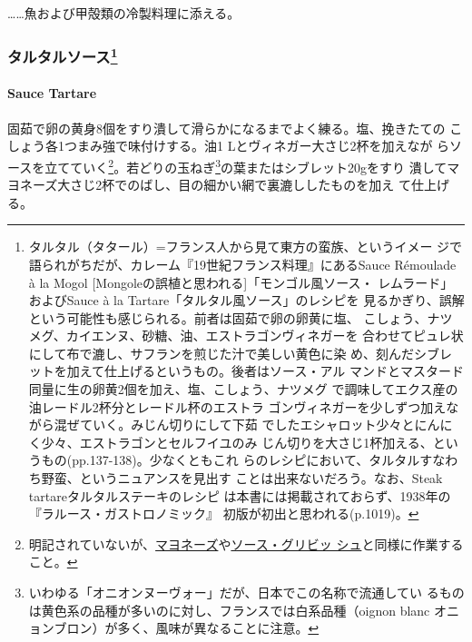 \begin{recette}
\ldots{}\ldots{}魚および甲殻類の冷製料理に添える。

\maeaki

\hypertarget{ux30bfux30ebux30bfux30ebux30bdux30fcux30b954}{%
\subsubsection[タルタルソース]{\texorpdfstring{タルタルソース\footnote{タルタル（タタール）=フランス人から見て東方の蛮族、というイメー
  ジで語られがちだが、カレーム『19世紀フランス料理』にあるSauce
  Rémoulade à la Mogol {[}Mongoleの誤植と思われる{]}「モンゴル風ソース・
  レムラード」およびSauce à la Tartare「タルタル風ソース」のレシピを
  見るかぎり、誤解という可能性も感じられる。前者は固茹で卵の卵黄に塩、
  こしょう、ナツメグ、カイエンヌ、砂糖、油、エストラゴンヴィネガーを
  合わせてピュレ状にして布で漉し、サフランを煎じた汁で美しい黄色に染
  め、刻んだシブレットを加えて仕上げるというもの。後者はソース・アル
  マンドとマスタード同量に生の卵黄2個を加え、塩、こしょう、ナツメグ
  で調味してエクス産の油レードル2杯分とレードル\undemi{}杯のエストラ
  ゴンヴィネガーを少しずつ加えながら混ぜていく。みじん切りにして下茹
  でしたエシャロット少々とにんにく少々、エストラゴンとセルフイユのみ
  じん切りを大さじ1杯加える、というもの(pp.137-138)。少なくともこれ
  らのレシピにおいて、タルタルすなわち野蛮、というニュアンスを見出す
  ことは出来ないだろう。なお、Steak tartareタルタルステーキのレシピ
  は本書には掲載されておらず、1938年の『ラルース・ガストロノミック』
  初版が初出と思われる(p.1019)。}}{タルタルソース}}\label{ux30bfux30ebux30bfux30ebux30bdux30fcux30b954}}

\hypertarget{sauce-tartare}{%
\paragraph{Sauce Tartare}\label{sauce-tartare}}


固茹で卵の黄身8個をすり潰して滑らかになるまでよく練る。塩、挽きたての
こしょう各1つまみ強で味付けする。油1 Lとヴィネガー大さじ2杯を加えなが
らソースを立てていく\footnote{明記されていないが、\protect\hyperlink{mayonnaise}{マヨネーズ}や\protect\hyperlink{sauce-gribiche}{ソース・グリビッ
  シュ}と同様に作業すること。}。若どりの玉ねぎ\footnote{いわゆる「オニオンヌーヴォー」だが、日本でこの名称で流通してい
  るものは黄色系の品種が多いのに対し、フランスでは白系品種（oignon blanc
  オニョンブロン）が多く、風味が異なることに注意。}の葉またはシブレット20gをすり
潰してマヨネーズ大さじ2杯でのばし、目の細かい網で裏漉ししたものを加え
て仕上げる。


\end{recette}
